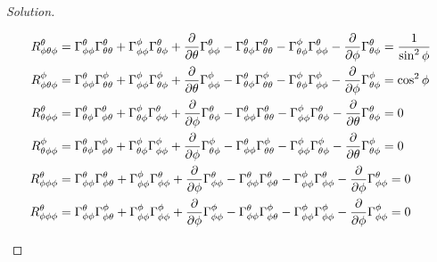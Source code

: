 \documentclass[a4paper]{article}
\begin{document}
\begin{proof}[Solution]
\begin{enumerate}
\[\begin{aligned}
      R_{\phi \theta \phi}^\theta &= \Gamma_{\phi \phi}^\theta \Gamma_{\theta \theta}^\theta + \Gamma_{\phi \phi}^\phi \Gamma_{\theta \phi}^\theta + \pdv{\theta} \Gamma_{\phi \phi}^\theta - \Gamma_{\theta \phi}^\theta \Gamma_{\theta \theta}^\theta  - \Gamma_{\theta \phi}^\phi \Gamma_{\phi \phi}^\theta - \pdv{\phi} \Gamma_{\theta \phi}^\theta =  \frac{1}{\sin^2 \phi} \\
      R_{\phi \theta \phi}^\phi &= \Gamma_{\phi \phi}^\theta \Gamma_{\theta \theta}^\phi + \Gamma_{\phi \phi}^\phi \Gamma_{\theta \phi}^\phi + \pdv{\theta} \Gamma_{\phi \phi}^\phi - \Gamma_{\theta \phi}^\theta \Gamma_{\theta \theta}^\phi  - \Gamma_{\theta \phi}^\phi \Gamma_{\phi \phi}^\phi - \pdv{\phi} \Gamma_{\theta \phi}^\phi =  \cos^2 \phi \\
      R_{\theta \phi \phi}^\theta &= \Gamma_{\theta \phi}^\theta \Gamma_{\phi \theta}^\theta + \Gamma_{\theta \phi}^\phi \Gamma_{\phi \phi}^\theta + \pdv{\phi} \Gamma_{\theta \phi}^\theta - \Gamma_{\phi \phi}^\theta \Gamma_{\theta \theta}^\theta  - \Gamma_{\phi \phi}^\phi \Gamma_{\theta \phi}^\theta - \pdv{\theta} \Gamma_{\theta \phi}^\theta =  0 \\
      R_{\theta \phi \phi}^\phi &= \Gamma_{\theta \phi}^\theta \Gamma_{\phi \theta}^\phi + \Gamma_{\theta \phi}^\phi \Gamma_{\phi \phi}^\phi + \pdv{\phi} \Gamma_{\theta \phi}^\phi - \Gamma_{\phi \phi}^\theta \Gamma_{\theta \theta}^\phi  - \Gamma_{\phi \phi}^\phi \Gamma_{\theta \phi}^\phi - \pdv{\theta} \Gamma_{\theta \phi}^\phi =  0 \\
      R_{\phi \phi \phi}^\theta &= \Gamma_{\phi \phi}^\theta \Gamma_{\phi \theta}^\theta + \Gamma_{\phi \phi}^\phi \Gamma_{\phi \phi}^\theta + \pdv{\phi} \Gamma_{\phi \phi}^\theta - \Gamma_{\phi \phi}^\theta \Gamma_{\phi \theta}^\theta  - \Gamma_{\phi \phi}^\phi \Gamma_{\phi \phi}^\theta - \pdv{\phi} \Gamma_{\phi \phi}^\theta =  0 \\
      R_{\phi \phi \phi}^\theta &= \Gamma_{\phi \phi}^\theta \Gamma_{\phi \theta}^\phi + \Gamma_{\phi \phi}^\phi \Gamma_{\phi \phi}^\phi + \pdv{\phi} \Gamma_{\phi \phi}^\phi - \Gamma_{\phi \phi}^\theta \Gamma_{\phi \theta}^\phi  - \Gamma_{\phi \phi}^\phi \Gamma_{\phi \phi}^\phi - \pdv{\phi} \Gamma_{\phi \phi}^\phi =  0 \\
    \end{aligned}
  \]
  \end{enumerate}
\end{proof}
\end{document}
